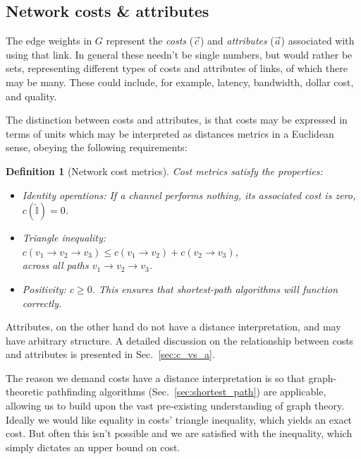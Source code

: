 \documentclass[aps, rmp, twocolumn, amsmath, amssymb, nofootinbib, superscriptaddress, longbibliography, floatfix, table-of-contents, eqsecnum]{revtex4-1}
\newtheorem{definition}{Definition}
\begin{document}
%
%

\subsection{Network costs \& attributes} \label{sec:costs} 

The edge weights in $G$ represent the \textit{costs} ($\vec c$) and \textit{attributes} ($\vec a$) associated with using that link. In general these needn't be single numbers, but would rather be sets, representing different types of costs and attributes of links, of which there may be many. These could include, for example, latency, bandwidth, dollar cost, and quality.

The distinction between costs and attributes, is that costs may be expressed in terms of units which may be interpreted as distances metrics in a Euclidean sense, obeying the following requirements:

\begin{definition}[Network cost metrics] \label{def:metric} Cost metrics satisfy the properties:
	\begin{itemize}
    	\item Identity operations: If a channel performs nothing, its associated cost is zero, \mbox{$c(\mathbb{\hat{I}}) = 0$}.
    	\item Triangle inequality: \\ $c(v_1\to v_2\to v_3) \leq c(v_1\to v_2) + c(v_2\to v_3)$, \\ across all paths \mbox{$v_1 \to v_2 \to v_3$}.
    	\item Positivity: \mbox{$c\geq 0$}. This ensures that shortest-path algorithms will function correctly.
	\end{itemize}
\end{definition}
Attributes, on the other hand do not have a distance interpretation, and may have arbitrary structure. A detailed discussion on the relationship between costs and attributes is presented in Sec.~\ref{sec:c_vs_a}.

The reason we demand costs have a distance interpretation is so that graph-theoretic pathfinding algorithms (Sec.~\ref{sec:shortest_path}) are applicable, allowing us to build upon the vast pre-existing understanding of graph theory. Ideally we would like equality in costs' triangle inequality, which yields an exact cost. But often this isn't possible and we are satisfied with the inequality, which simply dictates an upper bound on cost.
\end{document}
